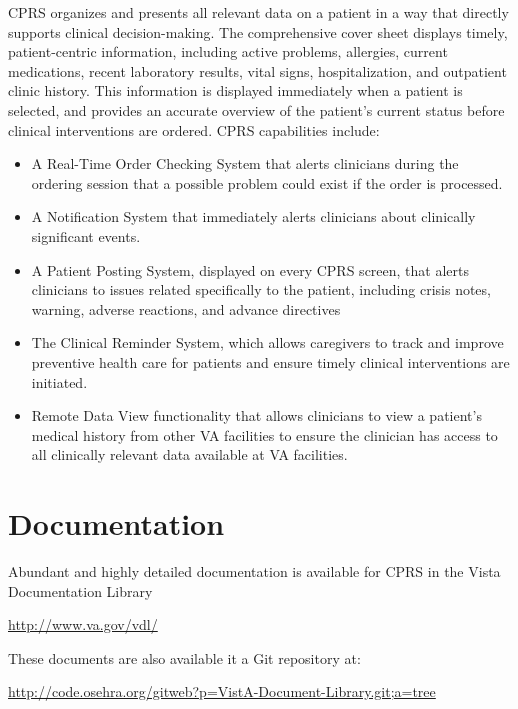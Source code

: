 \documentclass{OSEHRAArticle}
\begin{document}
CPRS organizes and presents all relevant data on a patient in a way that
directly supports clinical decision-making. The comprehensive cover sheet
displays timely, patient-centric information, including active problems,
allergies, current medications, recent laboratory results, vital signs,
hospitalization, and outpatient clinic history. This information is displayed
immediately when a patient is selected, and provides an accurate overview of
the patient’s current status before clinical interventions are ordered. CPRS
capabilities include:

\begin{itemize}

\item A Real-Time Order Checking System that alerts clinicians during the
ordering session that a possible problem could exist if the order is processed.

\item A Notification System that immediately alerts clinicians about clinically
significant events.

\item A Patient Posting System, displayed on every CPRS screen, that alerts
clinicians to issues related specifically to the patient, including crisis
notes, warning, adverse reactions, and advance directives

\item The Clinical Reminder System, which allows caregivers to track and
improve preventive health care for patients and ensure timely clinical
interventions are initiated.

\item Remote Data View functionality that allows clinicians to view a patient’s
medical history from other VA facilities to ensure the clinician has access to
all clinically relevant data available at VA facilities.

\end{itemize}


\section{Documentation}

Abundant and highly detailed documentation is available for CPRS in the Vista Documentation Library

\url{http://www.va.gov/vdl/}

These documents are also available it a Git repository at:

\url{http://code.osehra.org/gitweb?p=VistA-Document-Library.git;a=tree}
\end{document}
